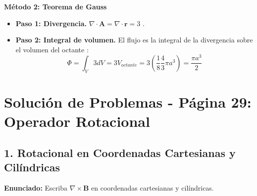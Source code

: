 \documentclass[a4paper]{article}
\begin{document}
\textbf{Método 2: Teorema de Gauss}
\begin{itemize}
    \item \textbf{Paso 1: Divergencia.} $\nabla \cdot \mathbf{A} = \nabla \cdot \mathbf{r} = 3$ \cite{91, 109}.
    \item \textbf{Paso 2: Integral de volumen.} El flujo es la integral de la divergencia sobre el volumen del octante \cite{92}:
    \begin{equation*}
        \Phi = \int_V 3 dV = 3 V_{octante} = 3 \left( \frac{1}{8} \frac{4}{3}\pi a^3 \right) = \frac{\pi a^3}{2}
    \end{equation*}
\end{itemize}


\section*{Solución de Problemas - Página 29: Operador Rotacional}

\subsection*{1. Rotacional en Coordenadas Cartesianas y Cilíndricas}
\textbf{Enunciado:} Escriba $\nabla \times \mathbf{B}$ en coordenadas cartesianas y cilíndricas.
\end{document}
